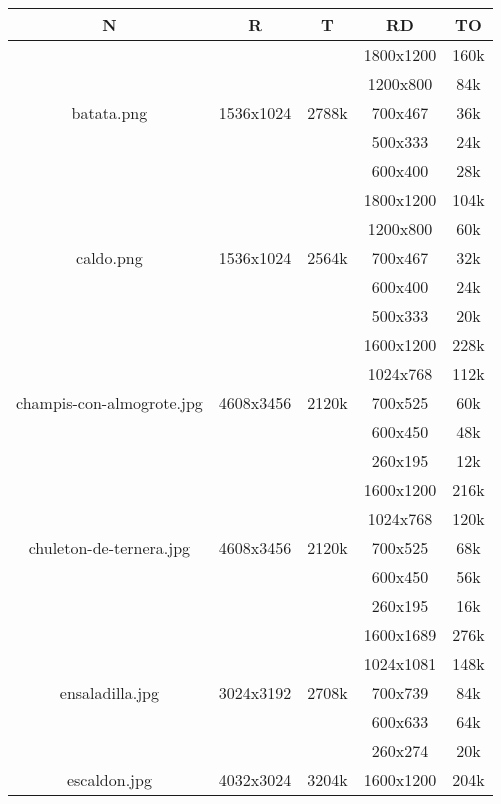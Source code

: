 \documentclass{article}
\begin{document}
\begin{longtable}{c|c|c|c|c}
    \hline
    \textbf{N} & \textbf{R} & \textbf{T} & \textbf{RD} & \textbf{TO} \\
    \endhead
    \hline
    \multirow{5}{*}{batata.png} & \multirow{5}{*}{1536x1024} & \multirow{5}{*}{2788k} & 1800x1200 & 160k \\
     &  &  & 1200x800 & 84k \\
     &  &  & 700x467 & 36k \\
     &  &  & 500x333 & 24k \\
     &  &  & 600x400 & 28k \\
    \hline
    \multirow{5}{*}{caldo.png} & \multirow{5}{*}{1536x1024} & \multirow{5}{*}{2564k} & 1800x1200 & 104k \\
     &  &  & 1200x800 & 60k \\
     &  &  & 700x467 & 32k \\
     &  &  & 600x400 & 24k \\
     &  &  & 500x333 & 20k \\
    \hline
    \multirow{5}{*}{champis-con-almogrote.jpg} & \multirow{5}{*}{4608x3456} & \multirow{5}{*}{2120k} & 1600x1200 & 228k \\
     &  &  & 1024x768 & 112k \\
     &  &  & 700x525 & 60k \\
     &  &  & 600x450 & 48k \\
     &  &  & 260x195 & 12k \\
    \hline
    \multirow{5}{*}{chuleton-de-ternera.jpg} & \multirow{5}{*}{4608x3456} & \multirow{5}{*}{2120k} & 1600x1200 & 216k \\
     &  &  & 1024x768 & 120k \\
     &  &  & 700x525 & 68k \\
     &  &  & 600x450 & 56k \\
     &  &  & 260x195 & 16k \\
    \hline
    \multirow{5}{*}{ensaladilla.jpg} & \multirow{5}{*}{3024x3192} & \multirow{5}{*}{2708k} & 1600x1689 & 276k \\
     &  &  & 1024x1081 & 148k \\
     &  &  & 700x739 & 84k \\
     &  &  & 600x633 & 64k \\
     &  &  & 260x274 & 20k \\
    \hline
    \multirow{5}{*}{escaldon.jpg} & \multirow{5}{*}{4032x3024} & \multirow{5}{*}{3204k} & 1600x1200 & 204k \\

\end{longtable}
\end{document}
